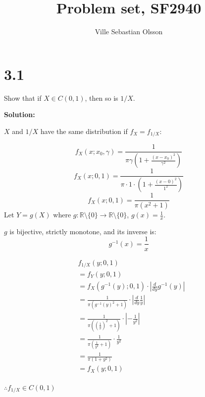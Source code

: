 \documentclass{article}
\title{Problem set, SF2940}
\author{Ville Sebastian Olsson}
\begin{document}
\maketitle

\section{3.1}

Show that if \(X \in C(0,1)\), then so is \(1/X\).

\textbf{Solution:}

\(X\) and \(1/X\) have the same distribution if \(f_X=f_{1/X}\):

\[f_X(x;x_0,\gamma) = \frac{1}{\pi\gamma(1+\frac{(x-x_0)^2}{\gamma^2})}\]
\[f_X(x;0,1) = \frac{1}{\pi \cdot 1 \cdot (1+\frac{(x-0)^2}{1^2})}\]
\[f_X(x;0,1) = \frac{1}{\pi (x^2+1)}\]
Let \(Y=g(X)\) where \(g: \mathbb{R}\setminus\{0\}\to\mathbb{R}\setminus\{0\}\), \(g(x) = \frac{1}{x}\).

\(g\) is bijective, strictly monotone, and its inverse is:
\[g^{-1}(x) = \frac{1}{x}\]

\begin{align*}
& f_{1/X}(y;0,1) \\
&= f_Y(y;0,1) \\
&= f_X(g^{-1}(y);0,1) \cdot |\frac{d}{dy}g^{-1}(y)| \\
&= \frac{1}{\pi (g^{-1}(y)^2+1)} \cdot |\frac{d}{dy}\frac{1}{y}| \\
&= \frac{1}{\pi ((\frac{1}{y})^2+1)} \cdot |-\frac{1}{y^2}| \\
&= \frac{1}{\pi (\frac{1}{y^2}+1)} \cdot \frac{1}{y^2} \\
&= \frac{1}{\pi (1+y^2)} \\
&= f_X(y;0,1) \\
\end{align*}

\(\therefore f_{1/X}\in C(0,1)\)
\end{document}
